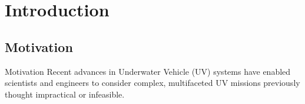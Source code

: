 
\section{Introduction}
\subsection{Motivation}
\begin{frame}[t]{Motivation}
  Recent advances in Underwater Vehicle (UV) systems have enabled
  scientists and engineers to consider complex, multifaceted UV
  missions previously thought impractical or infeasible.

%    
    \begin{columns}


\end{columns}
\end{frame}
